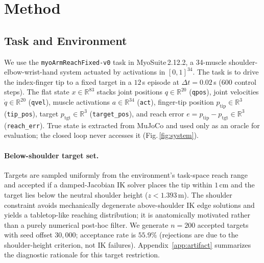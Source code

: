 \documentclass[sn-mathphys,NameDate,iicol]{sn-jnl}
\begin{document}
\section{Method}
\label{sec:method}

\subsection{Task and Environment}
\label{sec:method-task}
We use the \texttt{myoArmReachFixed-v0} task in MyoSuite\,2.12.2, a 34-muscle
shoulder-elbow-wrist-hand system actuated by activations in $[0,1]^{34}$.
The task is to drive the index-finger tip to a fixed target in a
$12$\,s episode at $\Delta t{=}0.02$\,s (600 control steps). The flat state $x\!\in\!\mathbb{R}^{83}$ stacks joint positions
$q\!\in\!\mathbb{R}^{20}$ (\texttt{qpos}), joint velocities
$\dot q\!\in\!\mathbb{R}^{20}$ (\texttt{qvel}), muscle activations
$a\!\in\!\mathbb{R}^{34}$ (\texttt{act}), finger-tip position
$p_{\mathrm{tip}}\!\in\!\mathbb{R}^{3}$ (\texttt{tip\_pos}), target
$p_{\mathrm{tgt}}\!\in\!\mathbb{R}^{3}$ (\texttt{target\_pos}), and reach
error $e{=}p_{\mathrm{tip}}-p_{\mathrm{tgt}}\!\in\!\mathbb{R}^{3}$
(\texttt{reach\_err}). True state is
extracted from MuJoCo and used only as an oracle for evaluation; the closed
loop never accesses it (Fig.\,\ref{fig:system}).

\paragraph{Below-shoulder target set.}
Targets are sampled uniformly from the environment's task-space reach range
and accepted if a damped-Jacobian IK solver places the tip within
$1$\,cm and the target lies below the neutral shoulder height
($z \!<\! 1.393$\,m). The shoulder constraint avoids mechanically
degenerate above-shoulder IK edge solutions and yields a tabletop-like
reaching distribution; it is anatomically motivated rather than a
purely numerical post-hoc filter. We generate $n{=}200$ accepted
targets with seed offset $30{,}000$; acceptance rate is $55.9\%$
(rejections are due to the shoulder-height criterion, not IK failures).
Appendix~\ref{app:artifact}
summarizes the diagnostic rationale for this target restriction.
\end{document}

